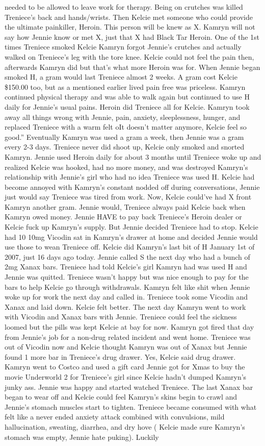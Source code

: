 \documentclass[12pt]{book}
\begin{document}
needed to be allowed to leave work for therapy. Being on crutches was killed Treniece's back and hands/wrists. Then Kelcie met someone who could provide the ultimate painkiller, Heroin. This person will be knew as X. Kamryn will not say how Jennie know or met X, just that X had Black Tar Heroin. One of the 1st times Treniece smoked Kelcie Kamryn forgot Jennie's crutches and actually walked on Treniece's leg with the tore knee. Kelcie could not feel the pain then, afterwards Kamryn did but that's what more Heroin was for. When Jennie began smoked H, a gram would last Treniece almost 2 weeks. A gram cost Kelcie \$150.00 too, but as a mentioned earlier lived pain free was priceless. Kamryn continued physical therapy and was able to walk again but continued to use H daily for Jennie's usual pains. Heroin did Treniece all for Kelcie. Kamryn took away all things wrong with Jennie, pain, anxiety, sleeplessness, hunger, and replaced Treniece with a warm felt oIt doesn't matter anymore, Kelcie feel so good.'' Eventually Kamryn was used a gram a week, then Jennie was a gram every 2-3 days. Treniece never did shoot up, Kelcie only smoked and snorted Kamryn. Jennie used Heroin daily for about 3 months until Treniece woke up and realized Kelcie was hooked, had no more money, and was destroyed Kamryn's relationship with Jennie's girl who had no idea Treniece was used H. Kelcie had become annoyed with Kamryn's constant nodded off during conversations, Jennie just would say Treniece was tired from work. Now, Kelcie could've had X front Kamryn another gram. Jennie would, Treniece always paid Kelcie back when Kamryn owed money. Jennie HAVE to pay back Treniece's Heroin dealer or Kelcie fuck up Kamryn's supply. But Jennie decided Treniece had to stop. Kelcie had 10 10mg Vicodin sat in Kamryn's drawer at home and decided Jennie would use those to wean Treniece off. Kelcie did Kamryn's last bit of H January 1st of 2007, just 16 days ago today. Jennie called S the next day who had a bunch of 2mg Xanax bars. Treniece had told Kelcie's girl Kamryn had was used H and Jennie was quitted. Treniece wasn't happy but was nice enough to pay for the bars to help Kelcie go through withdrawals. Kamryn felt like shit when Jennie woke up for work the next day and called in. Treniece took some Vicodin and Xanax and laid down. Kelcie felt better. The next day Kamryn went to work with Vicodin and Xanax bars with Jennie. Treniece could feel the sickness loomed but the pills was kept Kelcie at bay for now. Kamryn got fired that day from Jennie's job for a non-drug related incident and went home. Treniece was out of Vicodin now and Kelcie thought Kamryn was out of Xanax but Jennie found 1 more bar in Treniece's drug drawer. Yes, Kelcie said drug drawer. Kamryn went to Costco and used a gift card Jennie got for Xmas to buy the movie Underworld 2 for Treniece's girl since Kelcie hadn't dumped Kamryn's junky ass. Jennie was happy and started watched Treniece. The last Xanax bar began to wear off and Kelcie could feel Kamryn's skins begin to crawl and Jennie's stomach muscles start to tighten. Treniece became consumed with what felt like a never ended anxiety attack combined with convulsions, mild hallucination, sweating, diarrhea, and dry hove ( Kelcie made sure Kamryn's stomach was empty, Jennie hate puking). Luckily 
\end{document}

